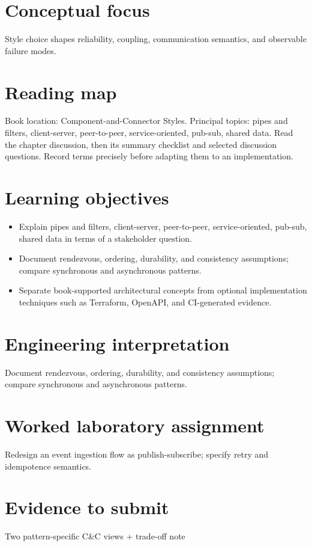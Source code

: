 \documentclass[10pt,letterpaper]{article}
\begin{document}
\DocProvenance
\section{Conceptual focus}
Style choice shapes reliability, coupling, communication semantics, and observable failure modes.

\section{Reading map}
Book location: Component-and-Connector Styles. Principal topics: pipes and filters, client-server, peer-to-peer, service-oriented, pub-sub, shared data. Read the chapter discussion, then its summary checklist and selected discussion questions. Record terms precisely before adapting them to an implementation.

\section{Learning objectives}
\begin{itemize}
\item Explain pipes and filters, client-server, peer-to-peer, service-oriented, pub-sub, shared data in terms of a stakeholder question.
\item Document rendezvous, ordering, durability, and consistency assumptions; compare synchronous and asynchronous patterns.
\item Separate book-supported architectural concepts from optional implementation techniques such as Terraform, OpenAPI, and CI-generated evidence.
\end{itemize}
\section{Engineering interpretation}
Document rendezvous, ordering, durability, and consistency assumptions; compare synchronous and asynchronous patterns.

\section{Worked laboratory assignment}
Redesign an event ingestion flow as publish-subscribe; specify retry and idempotence semantics.

\section{Evidence to submit}
Two pattern-specific C\&C views + trade-off note
\end{document}
